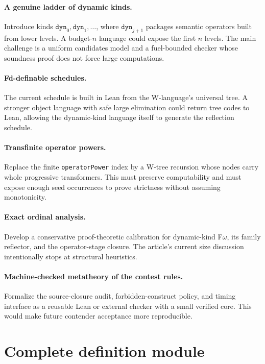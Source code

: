 \documentclass[11pt]{article}
\theoremstyle{definition}
\theoremstyle{remark}
\newcommand{\lean}[1]{\begingroup\def\_{\textunderscore\allowbreak}\ifmmode\text{\ttfamily #1}\else\texttt{#1}\fi\endgroup}
\begin{document}
\paragraph{A genuine ladder of dynamic kinds.}
Introduce kinds $\mathtt{dyn}_0,\mathtt{dyn}_1,\ldots$, where
$\mathtt{dyn}_{j+1}$ packages semantic operators built from lower levels.  A
budget-$n$ language could expose the first $n$ levels.  The main challenge is a
uniform candidates model and a fuel-bounded checker whose soundness proof does
not force large computations.

\paragraph{Fd-definable schedules.}
The current schedule is built in Lean from the W-language's universal tree.
A stronger object language with safe large elimination could return tree codes
to Lean, allowing the dynamic-kind language itself to generate the reflection
schedule.

\paragraph{Transfinite operator powers.}
Replace the finite \lean{operatorPower} index by a W-tree recursion whose nodes
carry whole progressive transformers.  This must preserve computability and
must expose enough seed occurrences to prove strictness without assuming
monotonicity.

\paragraph{Exact ordinal analysis.}
Develop a conservative proof-theoretic calibration for dynamic-kind
F$\omega$, its family reflector, and the operator-stage closure.  The article's
current size discussion intentionally stops at structural heuristics.

\paragraph{Machine-checked metatheory of the contest rules.}
Formalize the source-closure audit, forbidden-construct policy, and timing
interface as a reusable Lean or external checker with a small verified core.
This would make future contender acceptance more reproducible.

\appendix
\section{Complete definition module}
\end{document}
